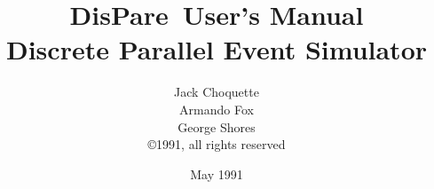 \protect
\newcommand{\dispare}{{\sc DisPare\ }}
\title{\dispare User's Manual\\
\normalsize Discrete Parallel Event Simulator}
\author{Jack Choquette \\ Armando Fox \\ George Shores \\
\copyright 1991, all rights reserved}
\date{\normalsize May 1991}


\maketitle
{}
\tableofcontents









